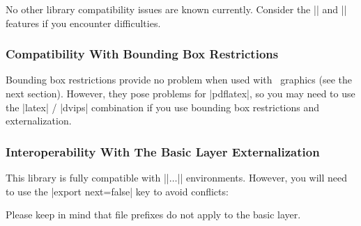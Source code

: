 {No other library compatibility issues are known currently. Consider the |\tikzexternaldisable| and |\tikzexternalenable| features if you encounter difficulties.


\subsubsection{Compatibility With Bounding Box Restrictions}
Bounding box restrictions provide no problem when used with \eps\ graphics (see the next section). However, they pose problems for |pdflatex|, so you may need to use the |latex| / |dvips| combination if you use bounding box restrictions and externalization.

\subsubsection{Interoperability With The Basic Layer Externalization}
This library is fully compatible with |\beginpgfgraphicnamed|$\dotsc$|\endpgfgraphicnamed| environments. However, you will need to use the |export next=false| key to avoid conflicts:
\begin{codeexample}
\tikzset{external/export next=false}
\endpgfgraphicnamed
\end{codeexample}
Please keep in mind that file prefixes do not apply to the basic layer.
}
\endinput
